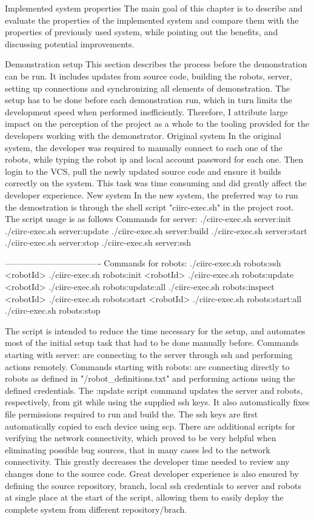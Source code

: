 \chap Implemented system properties
The main goal of this chapter is to describe and evaluate the properties of the implemented system and compare them with the properties of previously used system, while pointing out the benefits, and discussing potential improvements.

\sec Demonstration setup
This section describes the process before the demonstration can be run. It includes updates from source code, building the robots, server, setting up connections and synchronizing all elements of demonstration. \br
The setup has to be done before each demonstration run, which in turn limits the development speed when performed inefficiently. Therefore, I attribute large impact on the perception of the project as a whole to the tooling provided for the developers working with the demonstrator.
\secc Original system
In the original system, the developer was required to manually connect to each one of the robots, while typing the robot ip and local account password for each one. Then login to the VCS, pull the newly updated source code and ensure it builds correctly on the system. This task was time consuming and did greatly affect the developer experience.
\secc New system
In the new system, the preferred way to run the demostration is through the shell script "ciirc-exec.sh" in the project root. The script usage is as follows
\begtt
Commands for server:
./ciirc-exec.sh server:init
./ciirc-exec.sh server:update
./ciirc-exec.sh server:build
./ciirc-exec.sh server:start
./ciirc-exec.sh server:stop
./ciirc-exec.sh server:ssh

----------------------------------
Commands for robots:
./ciirc-exec.sh robots:ssh <robotId>
./ciirc-exec.sh robots:init <robotId>
./ciirc-exec.sh robots:update <robotId>
./ciirc-exec.sh robots:update:all
./ciirc-exec.sh robots:inspect <robotId>
./ciirc-exec.sh robots:start <robotId>
./ciirc-exec.sh robots:start:all
./ciirc-exec.sh robots:stop
\endtt

The script is intended to reduce the time necessary for the setup, and automates most of the initial setup task that had to be done manually before. \br
Commands starting with server: are connecting to the server through ssh and performing actions remotely. \br
Commands starting with robots: are connecting directly to robots as defined in "/robot_definitions.txt" and performing actions using the defined credentials. \br The :update script command updates the server and robots, respectively, from git while using the supplied ssh keys. It also automatically fixes file permissions required to run and build the. The ssh keys are first automatically copied to each device using scp. \br
There are additional scripts for verifying the network connectivity, which proved to be very helpful when eliminating possible bug sources, that in many cases led to the network connectivity. \br
This greatly decreases the developer time needed to review any changes done to the source code. Great developer experience is also ensured by defining the source repository, branch, local ssh credentials to server and robots at single place at the start of the script, allowing them to easily deploy the complete system from different repository/brach.

